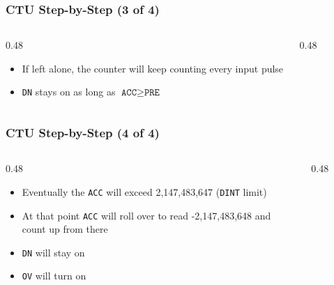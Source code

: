 \begin{frame}
    \frametitle{CTU Step-by-Step (3 of 4)}

    \begin{columns}
        \begin{column}{0.48\linewidth}
            \begin{itemize}
                \item If left alone, the counter will keep counting every input pulse
                \item \texttt{DN} stays on as long as $\texttt{ACC} \geq \texttt{PRE}$
            \end{itemize}
        \end{column}
        \begin{column}{0.48\linewidth}
            \begin{figure}
                \centering
                \resizebox{\columnwidth}{!}{
                    
                }
            \end{figure}
        \end{column}
    \end{columns}
\end{frame}

\begin{frame}
    \frametitle{CTU Step-by-Step (4 of 4)}

    \begin{columns}
        \begin{column}{0.48\linewidth}
            \begin{itemize}
                \item Eventually the \texttt{ACC} will exceed 2,147,483,647 (\texttt{DINT} limit)
                \item At that point \texttt{ACC} will roll over to read -2,147,483,648 and count up from there
                \item \texttt{DN} will stay on
                \item \texttt{OV} will turn on
            \end{itemize}
        \end{column}
        \begin{column}{0.48\linewidth}
            \begin{figure}
                \centering
                \resizebox{\columnwidth}{!}{
                    
                }
            \end{figure}
        \end{column}
    \end{columns}
\end{frame}

